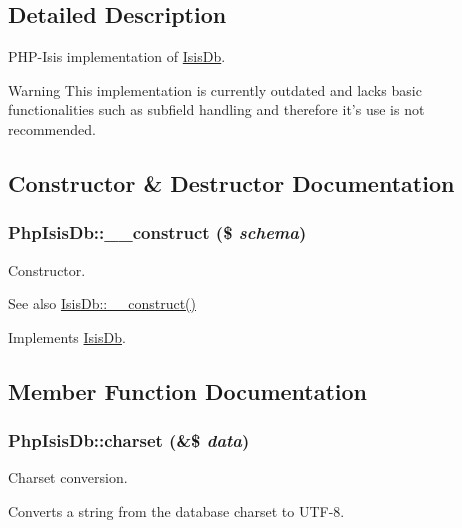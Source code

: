 \subsection{Detailed Description}
PHP-\/Isis implementation of \hyperlink{interfaceIsisDb}{IsisDb}.

\begin{DoxyWarning}{Warning}
This implementation is currently outdated and lacks basic functionalities such as subfield handling and therefore it's use is not recommended. 
\end{DoxyWarning}


\subsection{Constructor \& Destructor Documentation}
\hypertarget{classPhpIsisDb_abb6db51373d065baf9135fd278653bc5}{
\subsubsection[{\_\-\_\-construct}]{\setlength{\rightskip}{0pt plus 5cm}PhpIsisDb::\_\-\_\-construct (\$ {\em schema})}}
\label{classPhpIsisDb_abb6db51373d065baf9135fd278653bc5}
Constructor.

\begin{DoxySeeAlso}{See also}
\hyperlink{interfaceIsisDb_ae1c0a3496d55f710d34c5c19ada7a66b}{IsisDb::\_\-\_\-construct()} 
\end{DoxySeeAlso}


Implements \hyperlink{interfaceIsisDb_ae1c0a3496d55f710d34c5c19ada7a66b}{IsisDb}.



\subsection{Member Function Documentation}
\hypertarget{classPhpIsisDb_a46f8c39b305f170e2cf8ae5f4d218e74}{
\subsubsection[{charset}]{\setlength{\rightskip}{0pt plus 5cm}PhpIsisDb::charset (\&\$ {\em data})}}
\label{classPhpIsisDb_a46f8c39b305f170e2cf8ae5f4d218e74}
Charset conversion.

Converts a string from the database charset to UTF-\/8.


